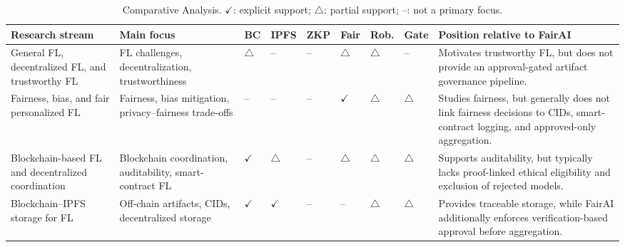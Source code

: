 \documentclass[futureinternet,article,submit,pdftex,moreauthors]{Definitions/mdpi}
\begin{document}
\begin{table}[htpb]
	\caption{Comparative Analysis. 
		\(\checkmark\): explicit support; \(\triangle\): partial support; --: not a primary focus.}
	\label{tab:comparative-analysis-results}
	\centering
	\scriptsize
	\setlength{\tabcolsep}{2.2pt}
	\renewcommand{\arraystretch}{1.05}
	
	\begin{tabularx}{\textwidth}{
			@{}
			p{2.35cm}
			p{2.25cm}
			>{\centering\arraybackslash}p{0.50cm}
			>{\centering\arraybackslash}p{0.55cm}
			>{\centering\arraybackslash}p{0.55cm}
			>{\centering\arraybackslash}p{0.60cm}
			>{\centering\arraybackslash}p{0.60cm}
			>{\centering\arraybackslash}p{0.60cm}
			X
			@{}}
		\toprule
		\textbf{Research stream} 
		& \textbf{Main focus} 
		& \textbf{BC} 
		& \textbf{IPFS} 
		& \textbf{ZKP} 
		& \textbf{Fair} 
		& \textbf{Rob.} 
		& \textbf{Gate} 
		& \textbf{Position relative to FairAI} \\
		\midrule
		
		General FL, decentralized FL, and trustworthy FL 
		\cite{intro_1,intro_2,intro_3}
		& FL challenges, decentralization, trustworthiness
		& \(\triangle\) & -- & -- & \(\triangle\) & \(\triangle\) & --
		& Motivates trustworthy FL, but does not provide an approval-gated artifact governance pipeline. \\
		
		Fairness, bias, and fair personalized FL 
		\cite{intro_4,intro_5,rw_16,rw_17,rw_18,rw_19}
		& Fairness, bias mitigation, privacy--fairness trade-offs
		& -- & -- & -- & \(\checkmark\) & \(\triangle\) & \(\triangle\)
		& Studies fairness, but generally does not link fairness decisions to CIDs, smart-contract logging, and approved-only aggregation. \\
		
		Blockchain-based FL and decentralized coordination 
		\cite{intro_6,intro_7,rw_20}
		& Blockchain coordination, auditability, smart-contract FL
		& \(\checkmark\) & \(\triangle\) & -- & \(\triangle\) & \(\triangle\) & \(\triangle\)
		& Supports auditability, but typically lacks proof-linked ethical eligibility and exclusion of rejected models. \\
		
		Blockchain--IPFS storage for FL 
		\cite{intro_8,rw_21}
		& Off-chain artifacts, CIDs, decentralized storage
		& \(\checkmark\) & \(\checkmark\) & -- & -- & \(\triangle\) & \(\triangle\)
		& Provides traceable storage, while FairAI additionally enforces verification-based approval before aggregation. \\
		

\end{tabularx}
\end{table}
\end{document}
